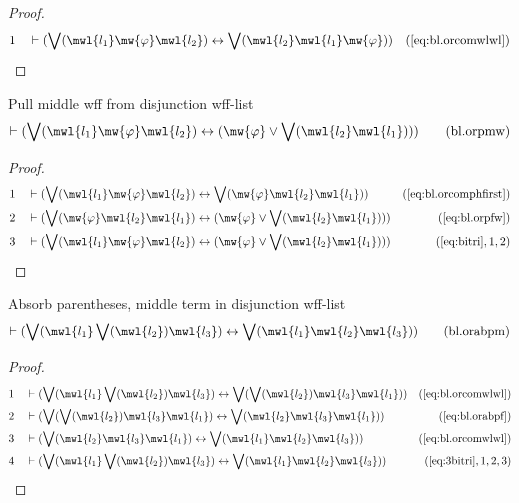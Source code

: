 \begin{proof}
\begin{align}
  1 &&  & \vdash ( \bigvee( \mwl{l_1} \mw{\varphi} \mwl{l_2} ) \leftrightarrow
     \bigvee( \mwl{l_2} \mwl{l_1} \mw{\varphi} )
     )&(\mbox{\ref{eq:bl.orcomwlwl}})\notag
\end{align}
\end{proof}

\begin{lemma} {Pull middle wff from disjunction wff-list}
\begin{align}
\vdash ( \bigvee( \mwl{l_1} \mw{\varphi} \mwl{l_2} ) \leftrightarrow (
    \mw{\varphi} \vee \bigvee( \mwl{l_2} \mwl{l_1} ) )
    )\label{eq:bl.orpmw}\tag{bl.orpmw}
\end{align}
\end{lemma}


\begin{proof}
\begin{align}
  1 &&  & \vdash ( \bigvee( \mwl{l_1} \mw{\varphi} \mwl{l_2} ) \leftrightarrow
     \bigvee( \mw{\varphi} \mwl{l_2} \mwl{l_1} )
     )&(\mbox{\ref{eq:bl.orcomphfirst}})\notag
  \\ 2 &&  & \vdash ( \bigvee( \mw{\varphi} \mwl{l_2} \mwl{l_1} )
     \leftrightarrow ( \mw{\varphi} \vee \bigvee(
     \mwl{l_2} \mwl{l_1} ) )
     )&(\mbox{\ref{eq:bl.orpfw}})\notag
  \\ 3 &&  & \vdash ( \bigvee( \mwl{l_1} \mw{\varphi} \mwl{l_2} )
     \leftrightarrow ( \mw{\varphi} \vee \bigvee(
     \mwl{l_2} \mwl{l_1} ) )
     )&(\mbox{\ref{eq:bitri}},1,2)\notag
\end{align}
\end{proof}

\begin{lemma} {Absorb parentheses, middle term in
disjunction wff-list}
\begin{align}
\vdash ( \bigvee( \mwl{l_1} \bigvee( \mwl{l_2} ) \mwl{l_3} ) \leftrightarrow
    \bigvee( \mwl{l_1} \mwl{l_2} \mwl{l_3} )
    )\label{eq:bl.orabpm}\tag{bl.orabpm}
\end{align}
\end{lemma}


\begin{proof}
\begin{align}
  1 &&  & \vdash ( \bigvee( \mwl{l_1} \bigvee( \mwl{l_2} ) \mwl{l_3} )
     \leftrightarrow \bigvee( \bigvee( \mwl{l_2} )
     \mwl{l_3} \mwl{l_1} )
     )&(\mbox{\ref{eq:bl.orcomwlwl}})\notag
  \\ 2 &&  & \vdash ( \bigvee( \bigvee( \mwl{l_2} ) \mwl{l_3} \mwl{l_1} )
     \leftrightarrow \bigvee( \mwl{l_2} \mwl{l_3}
     \mwl{l_1} ) )&(\mbox{\ref{eq:bl.orabpf}})\notag
  \\ 3 &&  & \vdash ( \bigvee( \mwl{l_2} \mwl{l_3} \mwl{l_1} ) \leftrightarrow
     \bigvee( \mwl{l_1} \mwl{l_2} \mwl{l_3} )
     )&(\mbox{\ref{eq:bl.orcomwlwl}})\notag
  \\ 4 &&  & \vdash ( \bigvee( \mwl{l_1} \bigvee( \mwl{l_2} ) \mwl{l_3} )
     \leftrightarrow \bigvee( \mwl{l_1} \mwl{l_2}
     \mwl{l_3} ) )&(\mbox{\ref{eq:3bitri}},1,2,3)\notag
\end{align}
\end{proof}

